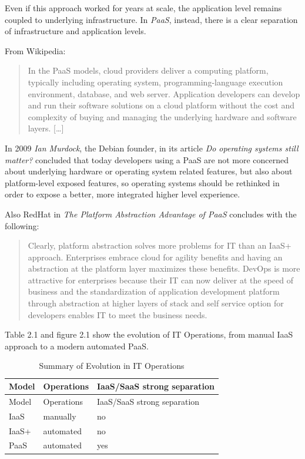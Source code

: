 Even if this approach worked for years at scale, the application level
remains coupled to underlying infrastructure. In \textit{PaaS}, instead,
there is a clear separation of infrastructure and application levels.

From Wikipedia:

\begin{quote}
In the PaaS models, cloud providers deliver a computing platform,
typically including operating system, programming-language execution
environment, database, and web server. Application developers can
develop and run their software solutions on a cloud platform without the
cost and complexity of buying and managing the underlying hardware and
software layers. {[}\ldots{}{]}
\end{quote}

In 2009 \textit{Ian Murdock}, the Debian founder, in its article \textit{Do
operating systems still matter?}\cite{DoOperatingSystemsStillMatter}
concluded that today developers using a PaaS are not more concerned
about underlying hardware or operating system related features, but also
about platform-level exposed features, so operating systems should be
rethinked in order to expose a better, more integrated higher level
experience.

Also RedHat in \textit{The Platform Abstraction Advantage of
PaaS}\cite{ThePlatformAbstractionAdvantageOfPaaS} concludes with the
following:

\begin{quote}
Clearly, platform abstraction solves more problems for IT than an IaaS+
approach. Enterprises embrace cloud for agility benefits and having an
abstraction at the platform layer maximizes these benefits. DevOps is
more attractive for enterprises because their IT can now deliver at the
speed of business and the standardization of application development
platform through abstraction at higher layers of stack and self service
option for developers enables IT to meet the business needs.
\end{quote}

Table 2.1 and figure 2.1 show the evolution of IT Operations, from manual IaaS approach to a modern automated PaaS.

\begin{longtable}[c]{@{}lll@{}}
\caption{Summary of Evolution in IT Operations}\tabularnewline
\toprule
Model & Operations & IaaS/SaaS strong separation\tabularnewline
\midrule
\endfirsthead
\toprule
Model & Operations & IaaS/SaaS strong separation\tabularnewline
\midrule
\endhead
IaaS & manually & no\tabularnewline
IaaS+ & automated & no\tabularnewline
PaaS & automated & yes\tabularnewline
\bottomrule
\end{longtable}

